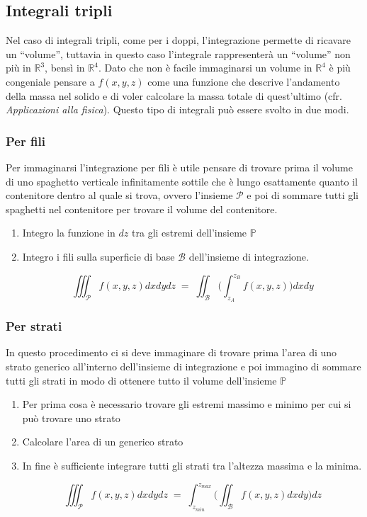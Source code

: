 \documentclass[10pt,a4paper]{report}
\begin{document}
		\subsection*{Integrali tripli}
		Nel caso di integrali tripli, come per i doppi, l'integrazione permette di ricavare un ``volume'', tuttavia in questo caso l'integrale rappresenterà un ``volume'' non più in $ \mathbb{R}^{3} $, bensì in $ \mathbb{R}^{4} $. Dato che non è facile immaginarsi un volume in $\mathbb{R}^{4}$ è più congeniale pensare a $f(x,y,z)$ come una funzione che descrive l'andamento della massa nel solido e di voler calcolare la massa totale di quest'ultimo (cfr. \textit{Applicazioni alla fisica}).
		Questo tipo di integrali può essere svolto in due modi.
			\subsubsection{Per fili}
			Per immaginarsi l'integrazione per fili è utile pensare di trovare prima il volume di uno spaghetto verticale infinitamente sottile che è lungo esattamente quanto il contenitore dentro al quale si trova, ovvero l'insieme $\mathcal{P}$ e poi di sommare tutti gli spaghetti nel contenitore per trovare il volume del contenitore.
				\begin{enumerate}
					\item Integro la funzione in $ dz $ tra gli estremi dell'insieme $ \mathbb{P} $
					\item Integro i fili sulla superficie di base $ \mathcal{B} $ dell'insieme di integrazione.
					
					\[ \iiint_{\mathcal{P}} f(x,y,z) dxdydz \; = \; \iint_{\mathcal{B}} \Big(\int_{z_{A}}^{z_{B}} f(x,y,z)\Big) dxdy\]
					
				\end{enumerate}
			\subsubsection{Per strati}
			In questo procedimento ci si deve immaginare di trovare prima l'area di uno strato generico all'interno dell'insieme di integrazione e poi immagino di sommare tutti gli strati in modo di ottenere tutto il volume dell'insieme $ \mathbb{P} $
				\begin{enumerate}
					\item Per prima cosa è necessario trovare gli estremi massimo e minimo per cui si può trovare uno strato
					\item Calcolare l'area di un generico strato
					\item In fine è sufficiente integrare tutti gli strati tra l'altezza massima e la minima.
					
					\[ \iiint_{\mathcal{P}} f(x,y,z) dxdydz \; = \; \int_{z_{min}}^{z_{max}} \Big(\iint_{\mathcal{B}} f(x,y,z) dxdy\Big)dz \]
					
				\end{enumerate}
		
\end{document}

